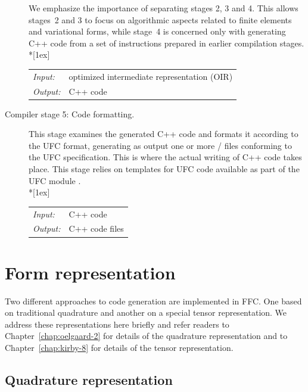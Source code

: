 \begin{description}
 We emphasize the importance of separating stages 2, 3 and 4. This
  allows stages~2 and 3 to focus on algorithmic aspects related to finite
  elements and variational forms, while stage~4 is concerned only with
  generating C++ code from a set of instructions prepared in earlier
  compilation stages. \\*[1ex]
  \begin{tabular}{ll}
    \emph{Input:}  & optimized intermediate representation (OIR) \\
    \emph{Output:} & C++ code
  \end{tabular}
\item[Compiler stage 5: Code formatting.]
  This stage examines the generated C++ code and formats it according to
  the UFC format, generating as output one or more / files
  conforming to the UFC specification. This is where the actual writing of C++
  code takes place. This stage relies on templates for UFC code
  available as part of the UFC module . \\*[1ex]
  \begin{tabular}{ll}
    \emph{Input:}  & C++ code \\
    \emph{Output:} & C++ code files
  \end{tabular}
\end{description}

\enlargethispage{6pt}

\vspace*{-6pt}
\section{Form representation}
\label{sec:logg-1:representation}

Two different approaches to code generation are implemented in
FFC. One based on traditional quadrature and another on a special
tensor representation. We address these representations here briefly
and refer readers to Chapter~\ref{chap:oelgaard-2} for details of the quadrature
representation and to Chapter~\ref{chap:kirby-8} for details of the tensor
representation.

\vspace*{3pt}
\subsection{Quadrature representation}

